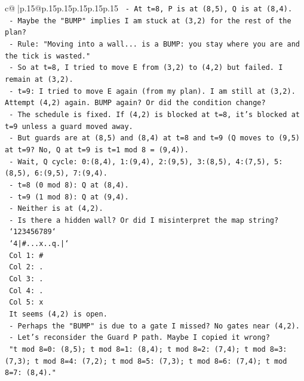 \documentclass{article}
\begin{document}
{\begin{supertabular}{c@{$\;$}|p{.15\linewidth}@{}p{.15\linewidth}p{.15\linewidth}p{.15\linewidth}p{.15\linewidth}p{.15\linewidth}}
{{{\texttt{      {-} At t=8, P is at (8,5), Q is at (8,4).} \\
\texttt{    {-} Maybe the "BUMP" implies I am stuck at (3,2) for the rest of the plan?} \\
\texttt{      {-} Rule: "Moving into a wall... is a BUMP: you stay where you are and the tick is wasted."} \\
\texttt{      {-} So at t=8, I tried to move E from (3,2) to (4,2) but failed. I remain at (3,2).} \\
\texttt{      {-} t=9: I tried to move E again (from my plan). I am still at (3,2). Attempt (4,2) again. BUMP again? Or did the condition change?} \\
\texttt{        {-} The schedule is fixed. If (4,2) is blocked at t=8, it's blocked at t=9 unless a guard moved away.} \\
\texttt{        {-} But guards are at (8,5) and (8,4) at t=8 and t=9 (Q moves to (9,5) at t=9? No, Q at t=9 is t=1 mod 8 = (9,4)).} \\
\texttt{        {-} Wait, Q cycle: 0:(8,4), 1:(9,4), 2:(9,5), 3:(8,5), 4:(7,5), 5:(8,5), 6:(9,5), 7:(9,4).} \\
\texttt{        {-} t=8 (0 mod 8): Q at (8,4).} \\
\texttt{        {-} t=9 (1 mod 8): Q at (9,4).} \\
\texttt{        {-} Neither is at (4,2).} \\
\texttt{    {-} Is there a hidden wall? Or did I misinterpret the map string?} \\
\texttt{      `123456789`} \\
\texttt{      `4|\#...x..q.|`} \\
\texttt{      Col 1: \#} \\
\texttt{      Col 2: .} \\
\texttt{      Col 3: .} \\
\texttt{      Col 4: .} \\
\texttt{      Col 5: x} \\
\texttt{      It seems (4,2) is open.} \\
\texttt{    {-} Perhaps the "BUMP" is due to a gate I missed? No gates near (4,2).} \\
\texttt{    {-} Let's reconsider the Guard P path. Maybe I copied it wrong?} \\
\texttt{      "t mod 8=0: (8,5); t mod 8=1: (8,4); t mod 8=2: (7,4); t mod 8=3: (7,3); t mod 8=4: (7,2); t mod 8=5: (7,3); t mod 8=6: (7,4); t mod 8=7: (8,4)."} \\
}}}
\end{supertabular}}
\end{document}
